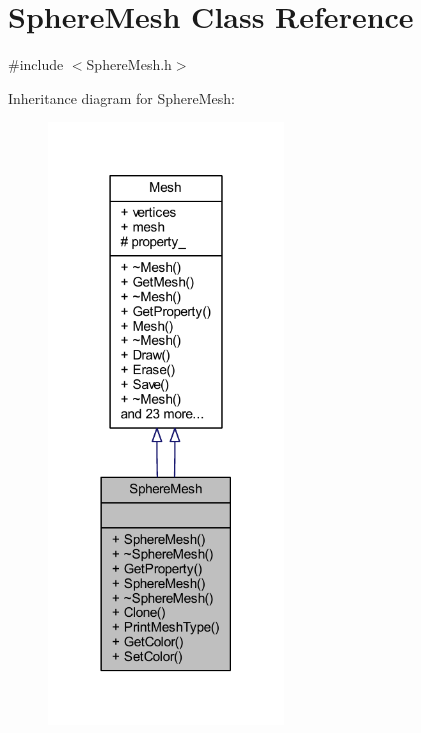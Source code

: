 \hypertarget{class_sphere_mesh}{}\section{Sphere\+Mesh Class Reference}
\label{class_sphere_mesh}


{\ttfamily \#include $<$Sphere\+Mesh.\+h$>$}



Inheritance diagram for Sphere\+Mesh\+:\nopagebreak
\begin{figure}[H]
\begin{center}
\leavevmode
\includegraphics[width=177pt]{class_sphere_mesh__inherit__graph}
\end{center}
\end{figure}


